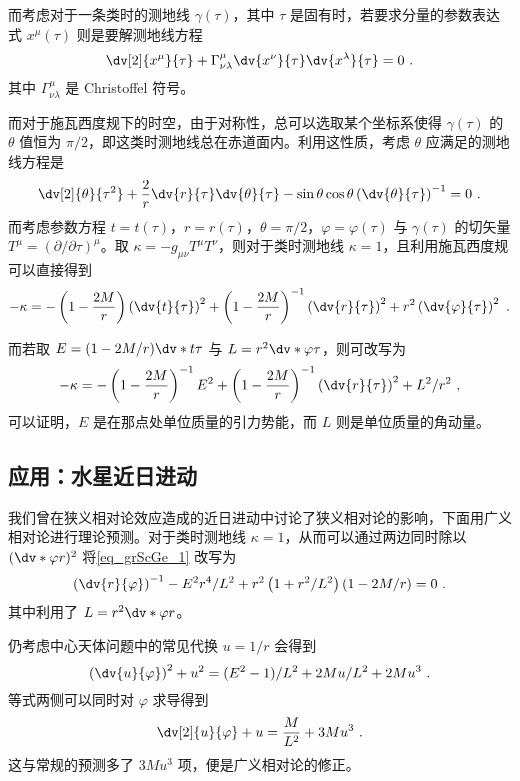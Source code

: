 而考虑对于一条类时的测地线 $\gamma(\tau)$，其中 $\tau$ 是固有时，若要求分量的参数表达式 $x^\mu(\tau)$ 则是要解测地线方程
\begin{equation}
\dv[2]{x^\mu}{\tau} + \Gamma^{\mu}_{\nu \lambda} \dv{x^\nu}{\tau} \dv{x^\lambda}{\tau} = 0~.
\end{equation}
其中 $\Gamma^\mu_{\nu \lambda}$ 是 Christoffel 符号。

而对于施瓦西度规下的时空，由于对称性，总可以选取某个坐标系使得 $\gamma(\tau)$ 的 $\theta$ 值恒为 $\pi/2$，即这类时测地线总在赤道面内。利用这性质，考虑 $\theta$ 应满足的测地线方程是
\begin{equation}
\dv[2]{\theta}{\tau^2} + \frac{2}{r} \dv{r}{\tau} \dv{\theta}{\tau} - \sin \theta \cos \theta \left(\dv{\theta}{\tau}\right)^{-1} = 0 ~.
\end{equation}
而考虑参数方程 $t = t(\tau)$，$r = r(\tau)$，$\theta = \pi/2$，$\varphi = \varphi(\tau)$ 与 $\gamma(\tau)$ 的切矢量 $T^\mu = (\partial/\partial \tau)^\mu$。取 $\kappa = -g_{\mu\nu} T^\mu T^\nu$，则对于类时测地线 $\kappa = 1$，且利用施瓦西度规可以直接得到
\begin{equation}
-\kappa = -\left(1 - \frac{2M}{r}\right)\left(\dv{t}{\tau}\right)^2 + \left(1-\frac{2M}{r}\right)^{-1} \left(\dv{r}{\tau}\right)^2 + r^2 \left(\dv{\varphi}{\tau}\right)^2 ~.
\end{equation}

而若取 $E = (1-2M/r) \dv*{t}{\tau}$ 与 $L = r^2 \dv*{\varphi}{\tau}$，则可改写为
\begin{equation}\label{eq_grScGe_1}
-\kappa = -\left(1-\frac{2M}{r}\right)^{-1} E^2  + \left(1-\frac{2M}{r}\right)^{-1} \left(\dv{r}{\tau}\right)^2 + L^2/r^2 ~,
\end{equation}
可以证明，$E$ 是在那点处单位质量的引力势能，而 $L$ 则是单位质量的角动量。

\subsection{应用：水星近日进动}\label{sub_grScGe_1}
我们曾在狭义相对论效应造成的近日进动中讨论了狭义相对论的影响，下面用广义相对论进行理论预测。对于类时测地线 $\kappa = 1$，从而可以通过两边同时除以 $(\dv*{\varphi}{r})^2$ 将\autoref{eq_grScGe_1} 改写为
\begin{equation}
\left( \dv{r}{\varphi} \right)^{-1} - E^2r^4/L^2 + r^2 \left( 1+r^2/L^2 \right)\left(1 - 2M/r\right) = 0 ~.
\end{equation}
其中利用了 $L = r^2 \dv*{\varphi}{r}$。

仍考虑中心天体问题中的常见代换 $u = 1/r$ 会得到
\begin{equation}
\left( \dv{u}{\varphi} \right)^2 + u^2 = (E^2-1)/L^2 + 2Mu/L^2 + 2Mu^3 ~.
\end{equation}
等式两侧可以同时对 $\varphi$ 求导得到
\begin{equation}
\dv[2]{u}{\varphi} + u = \frac{M}{L^2} + 3M u^3 ~.
\end{equation}
这与常规的预测多了 $3Mu^3$ 项，便是广义相对论的修正。